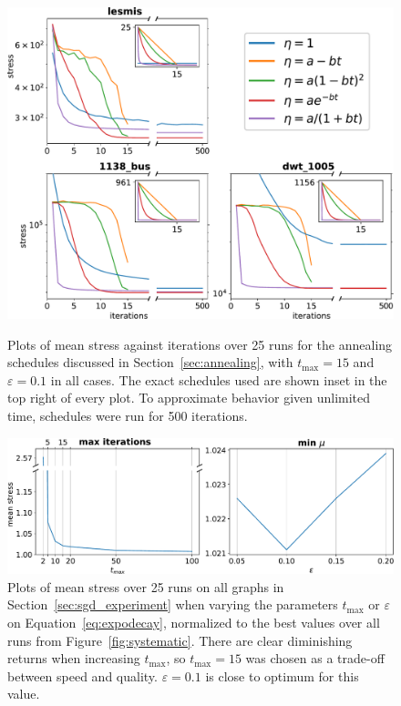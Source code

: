 \begin{figure}
  \centering
  \includegraphics[width=.85\textwidth]{stress/cooling.pdf}
  \caption[A comparison of different annealing schedules]{Plots of mean stress against iterations over 25 runs for the annealing schedules discussed in Section~\ref{sec:annealing}, with $t_{\max}=15$ and $\varepsilon=0.1$ in all cases. The exact schedules used are shown inset in the top right of every plot.
  To approximate behavior given unlimited time, schedules were run for 500 iterations.
  }
  \label{fig:annealing}
  \vspace*{\floatsep}
  \vspace*{\floatsep}
  \centering
  \includegraphics[width=.95\textwidth]{stress/parameters.pdf}
  \caption[A comparison of annealing schedule parameterisations]{Plots of mean stress over 25 runs on all graphs in Section~\ref{sec:sgd_experiment} when varying the parameters $t_{\max}$ or $\varepsilon$ on Equation~\eqref{eq:expodecay}, normalized to the best values over all runs from Figure~\ref{fig:systematic}.
  There are clear diminishing returns when increasing $t_{\max}$, so $t_{\max}=15$ was chosen as a trade-off between speed and quality.
  $\varepsilon=0.1$ is close to optimum for this value.
  }
  \label{fig:parameters}
\end{figure}

